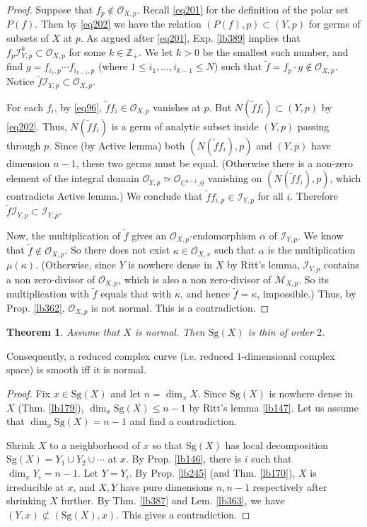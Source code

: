 \documentclass[12pt,b5paper,notitlepage]{report}
\theoremstyle{definition}
\theoremstyle{plain}
\newtheorem{thm}[df]{Theorem}
\newcommand{\wtd}{\widetilde}
\newcommand{\scr}{\mathscr}
\newcommand{\Cbb}{\mathbb C}
\newcommand{\Zbb}{\mathbb Z}
\newcommand{\Sg}{\mathrm{Sg}}
\numberwithin{equation}{section}
\begin{document}
\begin{proof}
Suppose that $f_p\notin \scr O_{X,p}$. Recall \eqref{eq201} for the definition of the polar set $P(f)$. Then by \eqref{eq202} we have the relation $(P(f),p)\subset (Y,p)$ for germs of subsets of $X$ at $p$. As argued after \eqref{eq201}, Exp. \ref{lb389} implies that $f_p\scr I_{Y,p}^k\subset\scr O_{X,p}$ for some $k\in\Zbb_+$. We let $k>0$ be the smallest such number, and find $g=f_{i_1,p}\cdots f_{i_{k-1},p}$ (where $1\leq i_1,\dots,i_{k-1}\leq N$) such that $\wtd f=f_p\cdot g\notin\scr O_{X,p}$. Notice $\wtd f\scr I_{Y,p}\subset\scr O_{X,p}$.

For each $f_i$,  by \eqref{eq96}, $\wtd ff_i\in\scr O_{X,p}$ vanishes at $p$. But $N(\wtd ff_i)\subset (Y,p)$ by \eqref{eq202}. Thus, $N(\wtd ff_i)$ is a germ of analytic subset inside $(Y,p)$ passing through $p$. Since (by Active lemma) both $(N(\wtd ff_i),p)$ and $(Y,p)$ have dimension $n-1$, these two germs must be equal. (Otherwise there is a non-zero element of the integral domain $\scr O_{Y,p}\simeq\scr O_{\Cbb^{n-1},0}$ vanishing on $(N(\wtd ff_i),p)$, which contradicts Active lemma.) We conclude that $\wtd ff_{i,p}\in\scr I_{Y,p}$ for all $i$. Therefore $\wtd f\scr I_{Y,p}\subset\scr I_{Y,p}$. 

Now, the multiplication of $\wtd f$ gives an $\scr O_{X,p}$-endomorphism $\alpha$ of $\scr I_{Y,p}$. We know that $\wtd f\notin\scr O_{X,p}$. So there does not exist $\kappa\in\scr O_{X,x}$ such that $\alpha$ is the multiplication $\mu(\kappa)$. (Otherwise, since $Y$ is nowhere dense in $X$ by Ritt's lemma, $\scr I_{Y,p}$ contains a non zero-divisor of $\scr O_{X,p}$, which is also a non zero-divisor of $\scr M_{X,p}$. So its multiplication with $\wtd f$ equals that with $\kappa$, and hence $\wtd f=\kappa$, impossible.) Thus, by Prop. \ref{lb362}, $\scr O_{X,p}$ is not normal. This is a contradiction.
\end{proof}



\begin{thm}\label{lb232}
Assume that $X$ is normal. Then $\Sg(X)$ is thin of order $2$.
\end{thm}



Consequently, a reduced complex curve (i.e. reduced $1$-dimensional complex space) is smooth iff it is normal.

\begin{proof}
Fix $x\in \Sg(X)$ and let $n=\dim_xX$. Since $\Sg(X)$ is nowhere dense in $X$ (Thm. \ref{lb179}), $\dim_x\Sg(X)\leq n-1$  by Ritt's lemma \ref{lb147}. Let us assume that $\dim_x\Sg(X)=n-1$ and find a contradiction.

Shrink $X$ to a neighborhood of $x$ so that $\Sg(X)$ has local decomposition $\Sg(X)=Y_1\cup Y_2\cup\cdots$ at $x$. By Prop. \ref{lb146}, there is $i$ such that $\dim_x Y_i=n-1$. Let $Y=Y_i$. By Prop. \ref{lb245} (and Thm. \ref{lb170}), $X$ is irreducible at $x$, and $X,Y$ have pure dimensions $n,n-1$ respectively after shrinking $X$ further. By Thm. \ref{lb387} and Lem. \ref{lb363}, we have $(Y,x)\nsubset (\Sg(X),x)$. This gives a contradiction.
\end{proof}
\end{document}
